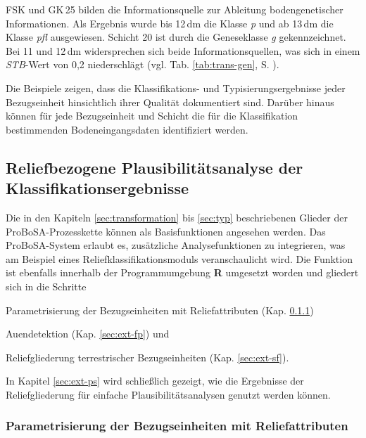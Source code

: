 FSK und GK\,25  bilden die Informationsquelle zur Ableitung bodengenetischer Informationen. Als Ergebnis wurde bis 12\,dm  die Klasse \textit{p} und ab 13\,dm die Klasse \textit{pfl} ausgewiesen. Schicht 20 ist durch die Geneseklasse \textit{g} gekennzeichnet. Bei  11 und 12\,dm widersprechen sich beide Informationsquellen, was sich in einem \textit{STB}-Wert von 0,2 niederschlägt (vgl. Tab. \ref{tab:trans-gen}, S. \pageref{tab:trans-gen}).\

Die Beispiele zeigen, dass die Klassifikations- und Typisierungsergebnisse jeder Bezugseinheit hinsichtlich ihrer Qualität dokumentiert sind. Darüber hinaus können  für jede Bezugseinheit und Schicht die für die Klassifikation bestimmenden Bodeneingangsdaten identifiziert werden. 



\subsection{Reliefbezogene Plausibilitätsanalyse der Klassifikationsergebnisse}\label{sec:ext}
Die in den Kapiteln \ref{sec:transformation} bis \ref{sec:typ} beschriebenen Glieder der ProBoSA-Prozesskette können als Basisfunktionen angesehen werden. Das ProBoSA-System erlaubt es, zusätzliche Analysefunktionen zu integrieren, was am Beispiel eines Reliefklassifikationsmoduls veranschaulicht wird. Die Funktion ist ebenfalls innerhalb der Programmumgebung \textbf{R} umgesetzt worden und gliedert sich in die Schritte

\begin{compactenum}
	\item Parametrisierung der Bezugseinheiten mit Reliefattributen (Kap. \ref{sec:ext-ta})
	\item Auendetektion (Kap. \ref{sec:ext-fp}) und
	\item Reliefgliederung terrestrischer Bezugseinheiten (Kap. \ref{sec:ext-sf}).
\end{compactenum}


In Kapitel \ref{sec:ext-ps} wird schließlich gezeigt, wie die Ergebnisse der Reliefgliederung für einfache Plausibilitätsanalysen genutzt werden können.

\subsubsection{Parametrisierung der Bezugseinheiten mit Reliefattributen}\label{sec:ext-ta}


